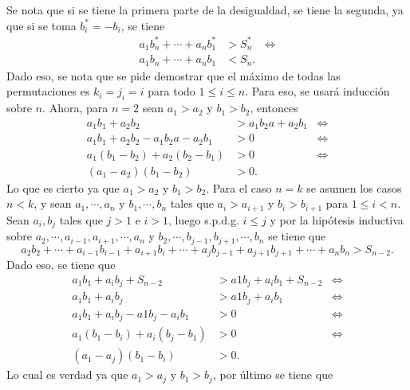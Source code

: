 \documentclass{ayudantia}
\begin{document}
\begin{ans}
    \begin{sol}
        Se nota que si se tiene la primera parte de la desigualdad, se tiene la segunda, ya que si se toma \(b^*_i=-b_i\), se tiene
        \begin{align*}
            a_1b^*_n+\cdots+a_nb^*_1 & >S_n^* & \iff \\
            a_1b_n+\cdots+a_nb_1     & <S_n.
        \end{align*}
        Dado eso, se nota que se pide demostrar que el máximo de todas las permutaciones es \(k_i=j_i=i\) para todo \(1\leq i\leq n\). Para eso, se usará inducción sobre \(n\). Ahora, para \(n=2\) sean \(a_1>a_2\) y \(b_1>b_2\), entonces
        \begin{align*}
            a_1b_1+a_2b_2                & >a_1b_2a+a_2b_1 & \iff \\
            a_1b_1+a_2b_2-a_1b_2a-a_2b_1 & >0              & \iff \\
            a_1(b_1-b_2)+a_2(b_2-b_1)    & >0              & \iff \\
            (a_1-a_2)(b_1-b_2)           & >0.
        \end{align*}
        Lo que es cierto ya que \(a_1>a_2\) y \(b_1>b_2\). Para el caso \(n=k\) se asumen los casos \(n<k\), y sean \(a_1,\cdots,a_n\) y \(b_1,\cdots, b_n\) tales que \(a_i>a_{i+1}\) y \(b_i>b_{i+1}\) para \(1\leq i<n\). Sean \(a_i,b_j\) tales que \(j>1\) e \(i>1\), luego s.p.d.g. \(i\leq j\) y por la hipótesis inductiva sobre \(a_2,\cdots,a_{i-1},a_{i+1},\cdots,a_n\) y \(b_2,\cdots,b_{j-1},b_{j+1},\cdots,b_n\) se tiene que
        \begin{equation*}
            a_2b_2+\cdots+a_{i-1}b_{i-1}+a_{i+1}b_i+\cdots+a_jb_{j-1}+a_{j+1}b_{j+1}+\cdots+a_nb_n>S_{n-2}.
        \end{equation*}
        Dado eso, se tiene que
        \begin{align*}
            a_1b_1+a_ib_j+S_{n-2}      & >a1b_j+a_ib_1+S_{n-2} & \iff \\
            a_1b_1+a_ib_j              & >a1b_j+a_ib_1         & \iff \\
            a_1b_1+a_ib_j-a1b_j-a_ib_1 & >0                    & \iff \\
            a_1(b_1-b_i)+a_i(b_j-b_1)  & >0                    & \iff \\
            (a_1-a_j)(b_1-b_i)         & >0.
        \end{align*}
        Lo cual es verdad ya que \(a_1>a_j\) y \(b_1>b_j\), por último se tiene que

\end{sol}
\end{ans}
\end{document}
